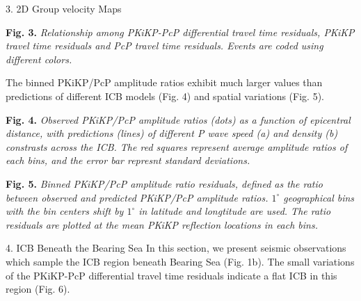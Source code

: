 \documentclass[
    landscape,      %
    paperwidth = 1200mm,
    paperheight = 900mm,
    fontscale = 0.34,
    margin = 1.7cm,
]{baposter}
\begin{document}
\begin{poster}
\begin{posterbox}[column=1]{3. 2D Group velocity Maps}
\begin{center}
\begin{minipage}{0.9\textwidth}
\footnotesize
\vspace{0.2em}
\textbf{Fig. 3.}
\itshape
Relationship among PKiKP-PcP differential travel time residuals, PKiKP
travel time residuals and PcP travel time residuals. Events are coded
using different colors.
\end{minipage}
\end{center}

\vspace{-0.15cm}
The binned PKiKP/PcP amplitude ratios exhibit much larger values than
predictions of different ICB models (Fig. 4) and spatial variations (Fig. 5).
\begin{center}
\begin{minipage}{0.50\textwidth}
\begin{minipage}{0.98\textwidth}
\vspace{0.1cm}
\footnotesize
\textbf{Fig. 4.}
\itshape
Observed PKiKP/PcP amplitude ratios (dots) as a function of epicentral distance,
with predictions (lines) of different P wave speed (a) and density (b) constrasts
across the ICB. The red squares represent average amplitude ratios of each bins, and
the error bar represnt standard deviations.
\end{minipage}
\end{minipage}
\hspace{0.2cm}
\begin{minipage}{0.45\textwidth}
\begin{minipage}{0.98\textwidth}
\vspace{0.3cm}
\footnotesize
\textbf{Fig. 5.}
\itshape
Binned PKiKP/PcP amplitude ratio residuals, defined as the ratio between
observed and predicted PKiKP/PcP amplitude ratios. $1^\circ$ geographical
bins with the bin centers shift by $1^\circ$ in latitude and longtitude are used.
The ratio residuals are plotted at the mean PKiKP reflection locations in each bins.
\end{minipage}
\end{minipage}
\end{center}
\end{posterbox}

\begin{posterbox}[column=2 ]{4. ICB Beneath the Bearing Sea}
In this section, we present seismic observations which sample the ICB region beneath
Bearing Sea (Fig. 1b). The small variations of the PKiKP-PcP differential
travel time residuals indicate a flat ICB in this region (Fig. 6).



\end{posterbox}
\end{poster}
\end{document}
